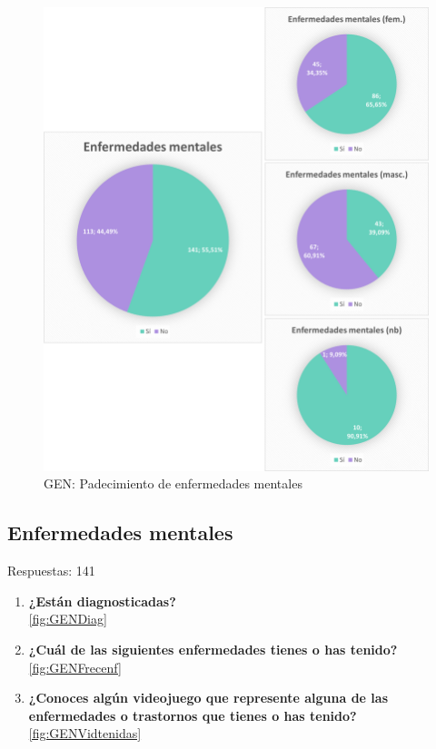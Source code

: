 \documentclass[12pt, a4paper,twoside,titlepage]{book}
\begin{document}
\begin{figure}
    \centering
    \includegraphics[width=1\linewidth]{ANEXO Gen/21AnexGENEnf}
    \caption{GEN: Padecimiento de enfermedades mentales}
    \label{fig:GENEnf}
\end{figure}



\subsection{Enfermedades mentales}
Respuestas: 141
\begin{enumerate}[label=\textbf{\arabic*}.]
     \item \textbf{¿Están diagnosticadas? }\\
     \ref{fig:GENDiag}
     \item \textbf{¿Cuál de las siguientes enfermedades tienes o has tenido?}\\
     \ref{fig:GENFrecenf}
     \item \textbf{¿Conoces algún videojuego que represente alguna de las enfermedades o trastornos que tienes o has tenido?}\\
     \ref{fig:GENVidtenidas}
\end{enumerate}
\end{document}
